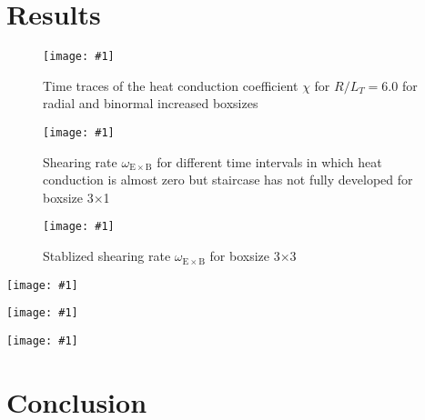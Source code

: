 \documentclass[aip, amsmath, amssymb, reprint, twocolumn]{revtex4-1}
\newcommand{\includegraphicsOneCol}[3]{
	\begin{figure}[ht]
		\texttt{[image: \#1]}
		\caption{#2}
  	\end{figure}
	\label{#3}
  	\increasecounter{fig}{1}
}
\newcommand{\includegraphicsTwoCol}[3]{
	\begin{figure*}
    	\texttt{[image: \#1]}
		\caption{#2}
	\end{figure*}
	\label{#3}
	\increasecounter{fig}{2}
}
\begin{document}
\section{Results}
\label{sec:results}

\includegraphicsOneCol{Comparison/Boxsize/S6_rlt6.0_boxsize1x1-2x2-3x3_Ns16_Nvpar48_Nmu9_eflux_comparison.pdf}{
	Time traces of the heat conduction coefficient $\chi$ for $R/L_T = 6.0$ for radial and binormal increased boxsizes
}{fig:eflux-1x1-2x2-3x3-comparison}

\includegraphicsOneCol{S6_rlt6.0/boxsize3x1/Ns16/Nvpar48/Nmu9/S6_rlt6.0_boxsize3x1_Ns16_Nvpar48_Nmu9_wexb_selection.pdf}{
	Shearing rate $\omega_{\mathrm{E \times B}}$ for different time intervals in which heat conduction is almost zero but staircase has not fully developed for boxsize 3$\times$1
}{fig:wexb-3x1-selection}

\includegraphicsOneCol{S6_rlt6.0/boxsize3x3/Ns16/Nvpar48/Nmu9/S6_rlt6.0_boxsize3x3_Ns16_Nvpar48_Nmu9_wexb_selection.pdf}{
	Stablized shearing rate $\omega_{\mathrm{E \times B}}$ for boxsize 3$\times$3
}{fig:wexb-3x3-stable}

\includegraphicsTwoCol{Comparison/Boxsize/S6_rlt6.0_boxsize2x1-2-3x1-3_Ns16_Nvpar48_Nmu9_eflux_comparison.pdf}{
	Comparison of time traces of the heat conduction coefficient $\chi$ for $R/L_T = 6.0$ for boxsize 2$\times$1 compared to 2$\times$2 and 3$\times$1 compared to 3$\times$3
}{fig:eflux-2x1-2-3x1-3-comparison}

\includegraphicsTwoCol{Comparison/Boxsize/S6_rlt6.0_boxsize1-2-3-4x1_Ns16_Nvpar48_Nmu9_wexb_comparison.pdf}{
	Comparison of shearing rate $\omega_{\mathrm{E \times B}}$ for radial increased boxsizes. The staircase structure got 
	shifted for better visibility.
}{fig:wexb-1-2-3-4x1-stable-comparison}

\includegraphicsTwoCol{Comparison/Boxsize/S6_rlt6.0_boxsize1-2-3-4x1_Ns16_Nvpar48_Nmu9_comparison.pdf}{
	\textbf{(a)} Time traces of the heat conduction coefficient $\chi$ for $R/L_T = 6.0$ for radial increased boxsizes \linebreak
	\textbf{(b)} Time traces of $|\hat{\omega}_{\mathrm{E\times B}}|_{k_\mathrm{i}}$ for radial increased boxsizes
}{fig:wexb-eflux-1-2-3-4x1-comparison}


\section{Conclusion}
\label{sec:conclusion}
\end{document}
